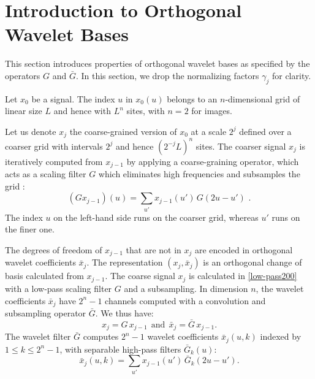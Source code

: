 \documentclass{article}
\begin{document}
\section{Introduction to Orthogonal Wavelet Bases}
\label{sec:wavelets-introduction}

This section introduces properties of orthogonal wavelet bases as specified by the operators $G$ and $\bar G$. In this section, we drop the normalizing factors $\gamma_j$ for clarity.

Let $x_0$ be a signal. The index $u$ in $x_0(u)$ belongs to an $n$-dimensional grid of linear size $L$ and hence with $L^n$ sites, with $n=2$ for images.

Let us denote $x_j$ the coarse-grained version of $x_0$ at a scale $2^j$ defined over a coarser grid with intervals $2^j$ and hence $(2^{-j} L)^n$ sites. The coarser signal $x_j$ is iteratively computed from $x_{j-1}$ by applying a coarse-graining operator, which acts as a scaling filter $G$ which eliminates high frequencies and subsamples
the grid \cite{Mallat:89}:
\begin{equation}
  \label{low-pass200}
(G x_{j-1}) (u) =  \sum_{u'} x_{j-1} (u')\, G (2u-u')\,\, .
\end{equation}
The index $u$ on the left-hand side runs on the coarser grid, whereas $u'$ runs on the finer one. 

\newcommand\aphi{x}
\newcommand\dphi{\bar x}
The degrees of freedom of $\aphi_{j-1}$ that are not in  $\aphi_{j}$ are encoded in orthogonal wavelet coefficients $\dphi_j$.
The representation $(\aphi_j , \dphi_j)$ 
is an orthogonal change of basis calculated from $\aphi_{j-1}$. The coarse signal
$\aphi_j$ is calculated in \eqref{low-pass200} with a low-pass scaling filter $G$ and a subsampling. In dimension $n$,
the wavelet coefficients $\dphi_j$ have $2^n-1$ channels computed with a convolution and subsampling operator $\bar G$. We thus have:
\begin{equation}
  \label{fastdec30}
\aphi_j = G\, \aphi_{j-1} ~~\mbox{and}~~
\dphi_j = \bar G\, \aphi_{j-1} .
\end{equation}
The wavelet filter
$\bar G$ computes $2^n-1$ wavelet coefficients $\dphi_j (u,k)$ indexed by $1 \leq k \leq 2^n-1$, 
with separable high-pass filters $\bar G_k(u)$:
\[
\dphi_{j} (u,k) =  \sum_{u'} \aphi_{j-1} (u')\, \bar G_k (2u-u').
\]
\end{document}
